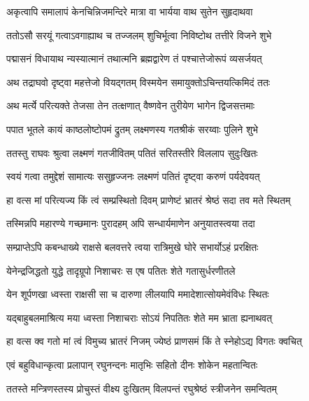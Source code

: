 \twolineshloka
{अकृत्वापि समालापं केनचिन्निजमन्दिरे}
{मात्रा वा भार्यया वाथ सुतेन सुहृदाथवा}%

\twolineshloka
{ततोऽसौ सरयूं गत्वाऽवगाह्याथ च तज्जलम्}
{शुचिर्भूत्वा निविष्टोथ तत्तीरे विजने शुभे}%

\twolineshloka
{पद्मासनं विधायाथ न्यस्यात्मानं तथात्मनि}
{ब्रह्मद्वारेण तं पश्चात्तेजोरूपं व्यसर्जयत्}%

\twolineshloka
{अथ तद्राघवो दृष्ट्वा महत्तेजो वियद्गतम्}
{विस्मयेन समायुक्तोऽचिन्तयत्किमिदं ततः}%

\twolineshloka
{अथ मर्त्ये परित्यक्ते तेजसा तेन तत्क्षणात्}
{वैष्णवेन तुरीयेण भागेन द्विजसत्तमाः}%

\twolineshloka
{पपात भूतले कायं काष्ठलोष्टोपमं द्रुतम्}
{लक्ष्मणस्य गतश्रीकं सरय्वाः पुलिने शुभे}%

\twolineshloka
{ततस्तु राघवः श्रुत्वा लक्ष्मणं गतजीवितम्}
{पतितं सरितस्तीरे विललाप सुदुःखितः}%

\twolineshloka
{स्वयं गत्वा तमुद्देशं सामात्यः ससुहृज्जनः}
{लक्ष्मणं पतितं दृष्ट्वा करुणं पर्यदेवयत्}%

\twolineshloka
{हा वत्स मां परित्यज्य किं त्वं सम्प्रस्थितो दिवम्}
{प्राणेष्टं भ्रातरं श्रेष्ठं सदा तव मते स्थितम्}%

\twolineshloka
{तस्मिन्नपि महारण्ये गच्छमानः पुरादहम्}
{अपि सन्धार्यमाणेन अनुयातस्त्वया तदा}%

\twolineshloka
{सम्प्राप्तेऽपि कबन्धाख्ये राक्षसे बलवत्तरे}
{त्वया रात्रिमुखे घोरे सभार्योऽहं प्ररक्षितः}%

\twolineshloka
{येनेन्द्रजिद्धतो युद्धे तादृग्रूपो निशाचरः}
{स एष पतितः शेते गतासुर्धरणीतले}%

\twolineshloka
{येन शूर्पणखा ध्वस्ता राक्षसी सा च दारुणा}
{लीलयापि ममादेशात्सोयमेवंविधः स्थितः}%

\twolineshloka
{यद्बाहुबलमाश्रित्य मया ध्वस्ता निशाचराः}
{सोऽयं निपतितः शेते मम भ्राता ह्यनाथवत्}%

\twolineshloka
{हा वत्स क्व गतो मां त्वं विमुच्य भ्रातरं निजम्}
{ज्येष्ठं प्राणसमं किं ते स्नेहोऽद्य विगतः क्वचित्}%


\twolineshloka
{एवं बहुविधान्कृत्वा प्रलापान् रघुनन्दनः}
{मातृभिः सहितो दीनः शोकेन महतान्वितः}%

\twolineshloka
{ततस्ते मन्त्रिणस्तस्य प्रोचुस्तं वीक्ष्य दुःखितम्}
{विलपन्तं रघुश्रेष्ठं स्त्रीजनेन समन्वितम्}%


